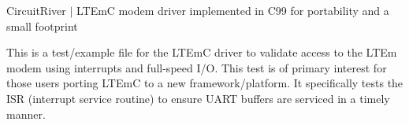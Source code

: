 Circuit\+River $\vert$ LTEmC modem driver implemented in C99 for portability and a small footprint

This is a test/example file for the LTEmC driver to validate access to the LTEm modem using interrupts and full-\/speed I/O. This test is of primary interest for those users porting LTEmC to a new framework/platform. It specifically tests the ISR (interrupt service routine) to ensure UART buffers are serviced in a timely manner. 
